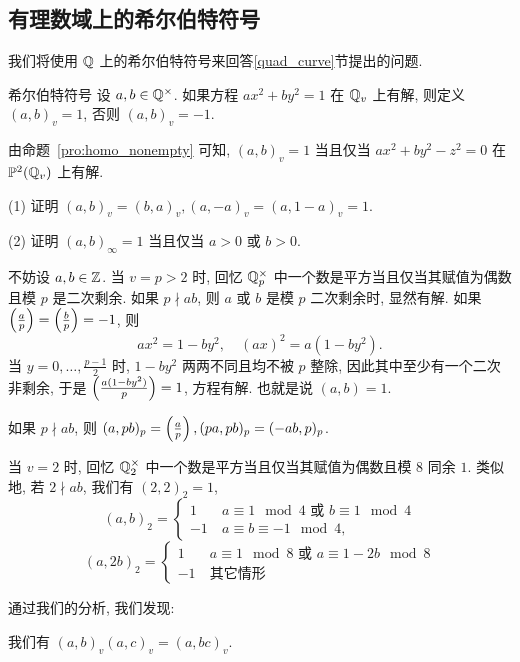 \subsection{有理数域上的希尔伯特符号}
\label{2:hilbert_symbol}
我们将使用 ${\mathbb{Q}}$ 上的希尔伯特符号来回答\ref{quad_curve}节提出的问题.

\begin{definition}{希尔伯特符号}{}
设 $a,b\in{\mathbb{Q}}^\times$. 如果方程 $ax^2+by^2=1$ 在 ${\mathbb{Q}}_v$ 上有解, 则定义 $(a,b)_v=1$, 否则 $(a,b)_v=-1$.
\end{definition}

由命题~\ref{pro:homo_nonempty} 可知, $(a,b)_v=1$ 当且仅当 $ax^2+by^2-z^2=0$ 在 ${\mathbb{P}}^2({\mathbb{Q}}_v)$ 上有解. 

\begin{exercise}
(1) 证明 $(a,b)_v=(b,a)_v, (a,-a)_v=(a,1-a)_v=1$.

(2) 证明 $(a,b)_\infty=1$ 当且仅当 $a>0$ 或 $b>0$.
\end{exercise}

不妨设 $a,b\in{\mathbb{Z}}$. 当 $v=p>2$ 时, 回忆 ${\mathbb{Q}}_p^\times$ 中一个数是平方当且仅当其赋值为偶数且模 $p$ 是二次剩余. 如果 $p\nmid ab$, 则 $a$ 或 $b$ 是模 $p$ 二次剩余时, 显然有解. 如果 $\left(\frac{{a}}{p}\right)=\left(\frac{{b}}{p}\right)=-1$, 则
  \[ax^2=1-by^2,\quad (ax)^2=a(1-by^2).\]
当 $y=0,\dots,\frac{p-1}{2}$ 时, $1-by^2$ 两两不同且均不被 $p$ 整除, 因此其中至少有一个二次非剩余, 于是 $\left(\frac{{a(1-by^2)}}{p}\right)=1$, 方程有解. 也就是说 $(a,b)=1$.

\begin{exercise}
如果 $p\nmid ab$, 则 $(a,pb)_p=\left(\frac{{a}}{p}\right), (pa,pb)_p=(-ab,p)_p$.
\end{exercise}

当 $v=2$ 时, 回忆 ${\mathbb{Q}}_2^\times$ 中一个数是平方当且仅当其赋值为偶数且模 $8$ 同余 $1$. 类似地, 若 $2\nmid ab$, 我们有 $(2,2)_2=1$,
  \[(a,b)_2=\begin{cases}
1\quad &a\equiv 1\mod 4\text{ 或 } b\equiv 1\mod 4\\
-1 & a\equiv b\equiv -1\mod 4,
\end{cases}\]
  \[(a,2b)_2=\begin{cases}
1\quad &a\equiv 1\mod 8\text{ 或 } a\equiv 1-2b\mod 8\\
-1&\text{其它情形}
\end{cases}\]

通过我们的分析, 我们发现:
\begin{proposition}{}{}
我们有 $(a,b)_v(a,c)_v=(a,bc)_v$.
\end{proposition}

